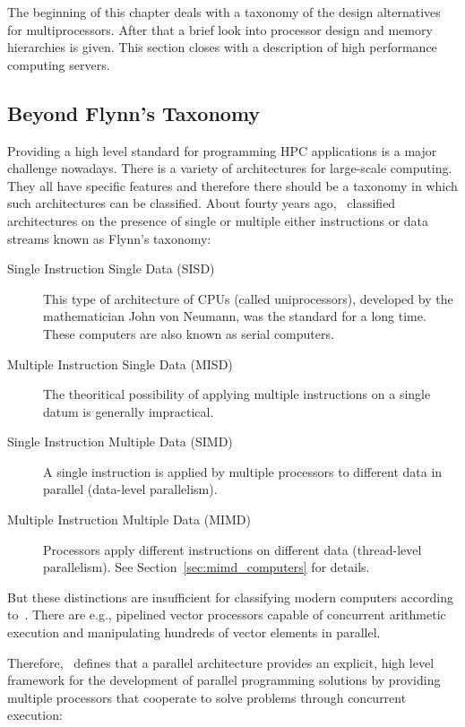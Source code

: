 The beginning of this chapter deals with a taxonomy of
the design alternatives for multiprocessors. After that a brief look
into processor design and memory hierarchies is given. This section
closes with a description of high performance computing servers.

\subsection{Beyond Flynn's Taxonomy}
\label{sec:flynn}
Providing a high level standard for programming HPC applications is a
major challenge nowadays. There is a variety of architectures for
large-scale computing. They all have specific features and 
therefore there should be a taxonomy in which such architectures can
be classified. About fourty years ago, \cite{flynn72sco}~classified
architectures on the
presence of single or multiple either instructions or data streams
known as Flynn's taxonomy:
\begin{description}
\item[Single Instruction Single Data (SISD)]
  This type of architecture of CPUs (called uniprocessors),
  developed by the 
  mathematician John von Neumann, was the standard for a long
  time. These computers are also known as serial computers. 
\item[Multiple Instruction Single Data (MISD)] The theoritical possibility
  of applying multiple instructions on a single datum is generally
  impractical.
\item[Single Instruction Multiple Data (SIMD)] 
  A single instruction is applied by multiple processors to different
  data in parallel (data-level parallelism). 
\item[Multiple Instruction Multiple Data (MIMD)] Processors apply
  different instructions on different data (thread-level
  parallelism). See Section~\ref{sec:mimd_computers} for details. 
\end{description}

But these distinctions are insufficient for classifying modern
computers according to~\cite{duncan90survey}. There are e.g.,
pipelined vector processors capable of concurrent arithmetic execution and
manipulating hundreds of vector elements in parallel.

Therefore,~\cite{duncan90survey} defines that a parallel architecture
provides an explicit, high level framework for 
the development of parallel programming solutions by providing
multiple processors that cooperate to solve problems through
concurrent execution:

